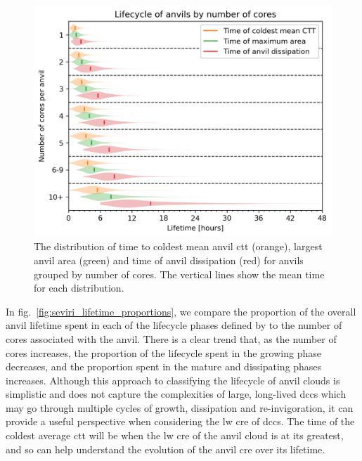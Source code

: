 \begin{figure}[tp]
    \includegraphics[width=\textwidth]{figures/ch3_08.png}
    \caption[
    The distribution of time to coldest mean anvil \acrshort{ctt}, largest anvil area and time of anvil dissipation
    ]{
    The distribution of time to coldest mean anvil \acrshort{ctt} (orange), largest anvil area (green) and time of anvil dissipation (red) for anvils grouped by number of cores. The vertical lines show the mean time for each distribution.
    }
    \label{fig:seviri_lifetime_dists}
\end{figure}


In fig.~\ref{fig:seviri_lifetime_proportions}, we compare the proportion of the overall anvil lifetime spent in each of the lifecycle phases defined by \citet{futyan_deep_2007} to the number of cores associated with the anvil. 
There is a clear trend that, as the number of cores increases, the proportion of the lifecycle spent in the growing phase decreases, and the proportion spent in the mature and dissipating phases increases.
 Although this approach to classifying the lifecycle of anvil clouds is simplistic and does not capture the complexities of large, long-lived \acrshort{dcc}s which may go through multiple cycles of growth, dissipation and re-invigoration, it can provide a useful perspective when considering the \acrshort{lw} \acrshort{cre} of \acrshort{dcc}s. 
 The time of the coldest average \acrshort{ctt} will be when the \acrshort{lw} \acrshort{cre} of the anvil cloud is at its greatest, and so can help understand the evolution of the anvil \acrshort{cre} over its lifetime.


